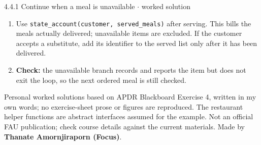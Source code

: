 \documentclass[11pt]{article}
\begin{document}
\begin{keepsection}
\begin{workedbox}{4.4.1 Continue when a meal is unavailable \ensuremath{\cdot} worked solution}
\begin{enumerate}
\begin{tcolorbox}[colback=Paperblue,colframe=Paperblue,boxrule=0pt,arc=0pt,left=7pt,right=7pt,top=5pt,bottom=5pt]
\noindent\hspace*{3em}\texttt{else:}\par
\noindent\hspace*{5em}\texttt{notify\_unavailable(customer, meal\_id)}\par
\noindent\hspace*{5em}\texttt{unavailable\_meals.append(meal\_id)}\par
\noindent\hspace*{1em}\texttt{return served\_meals, unavailable\_meals}\par
\end{tcolorbox}
\item Use \texttt{state\_account(customer, served\_meals)} after serving. This bills the meals actually delivered; unavailable items are excluded. If the customer accepts a substitute, add its identifier to the served list only after it has been delivered.
\item \textbf{Check:} the unavailable branch records and reports the item but does not exit the loop, so the next ordered meal is still checked.
\end{enumerate}
\end{workedbox}

\end{keepsection}

\vfill{\small Personal worked solutions based on APDR Blackboard Exercise 4, written in my own words; no exercise-sheet prose or figures are reproduced. The restaurant helper functions are abstract interfaces assumed for the example. Not an official FAU publication; check course details against the current materials. Made by \textbf{Thanate Amornjiraporn (Focus)}.}
\end{document}
